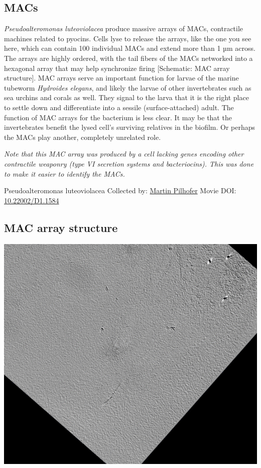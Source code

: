 \documentclass[]{tufte-book}
\begin{document}
\hypertarget{MACs}{%
\subsection{MACs}\label{MACs}}

\emph{Pseudoalteromonas luteoviolacea} produce massive arrays of MACs, contractile machines related to pyocins. Cells lyse to release the arrays, like the one you see here, which can contain 100 individual MACs and extend more than 1 µm across. The arrays are highly ordered, with the tail fibers of the MACs networked into a hexagonal array that may help synchronize firing {[}Schematic: MAC array structure{]}. MAC arrays serve an important function for larvae of the marine tubeworm \emph{Hydroides elegans}, and likely the larvae of other invertebrates such as sea urchins and corals as well. They signal to the larva that it is the right place to settle down and differentiate into a sessile (surface-attached) adult. The function of MAC arrays for the bacterium is less clear. It may be that the invertebrates benefit the lysed cell's surviving relatives in the biofilm. Or perhaps the MACs play another, completely unrelated role.

\emph{Note that this MAC array was produced by a cell lacking genes encoding other contractile weaponry (type VI secretion systems and bacteriocins). This was done to make it easier to identify the MACs.}



\hypertarget{htmlwidget-e0eb5841c247f2f5c24f}{}

\label{fig:9-7b}Pseudoalteromonas luteoviolacea Collected by: \protect\hyperlink{martin_pilhofer}{Martin Pilhofer} Movie DOI: \href{https://doi.org/10.22002/D1.1584}{10.22002/D1.1584}

\hypertarget{MAC_array_structure}{%
\subsection{MAC array structure}\label{MAC_array_structure}}

\includegraphics{img/schematics/9_7_2}
\end{document}
